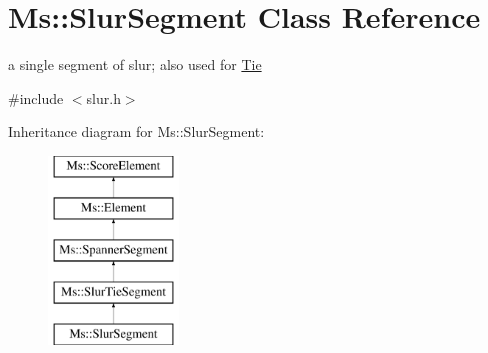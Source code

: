 \hypertarget{class_ms_1_1_slur_segment}{}\section{Ms\+:\+:Slur\+Segment Class Reference}
\label{class_ms_1_1_slur_segment}


a single segment of slur; also used for \hyperlink{class_ms_1_1_tie}{Tie}  




{\ttfamily \#include $<$slur.\+h$>$}

Inheritance diagram for Ms\+:\+:Slur\+Segment\+:\begin{figure}[H]
\begin{center}
\leavevmode
\includegraphics[height=5.000000cm]{class_ms_1_1_slur_segment}
\end{center}
\end{figure}
